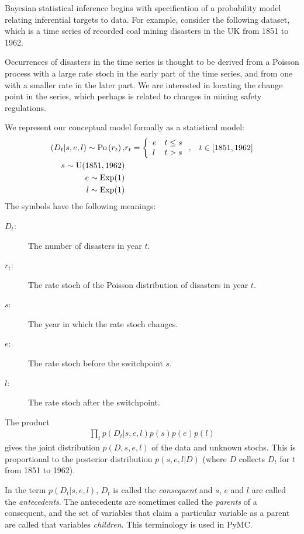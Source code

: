 \documentclass[]{book}
\begin{document}
Bayesian statistical inference begins with specification of a probability model relating inferential targets to data. For example, consider the following dataset, which is a time series of recorded coal mining disasters in the UK from 1851 to 1962.
\begin{center}
\end{center}
Occurrences of disasters in the time series is thought to be derived from a Poisson process with a large rate stoch in the early part of the time series, and from one with a smaller rate in the later part. We are interested in locating the change point in the series, which perhaps is related to changes in mining safety regulations.

We represent our conceptual model formally as a statistical model:
\begin{eqnarray*}
(D_t | s, e, l) \sim \textup{Po}\left(r_t\right), & r_t=\left\{\begin{array}{ll}
    e & t\le s\\ l & t>s
    \end{array}\right.,&t\in[1851,1962]\\
s\sim \textup{U}(1851, 1962)\\
e\sim \textup{Exp}(1)\\
l\sim \textup{Exp}(1)
\end{eqnarray*}
The symbols have the following meanings:
\begin{description}
    \item[$D_t$:] The number of disasters in year $t$.
    \item[$r_t$:] The rate stoch of the Poisson distribution of disasters in year $t$.
    \item[$s$:] The year in which the rate stoch changes.
    \item[$e$:] The rate stoch before the switchpoint $s$.
    \item[$l$:] The rate stoch after the switchpoint.
\end{description}

The product
\begin{eqnarray*}
\prod_t p(D_t|s,e,l) p(s)p(e)p(l)
\end{eqnarray*}
gives the joint distribution $p(D,s,e,l)$ of the data and unknown stochs. This is proportional to the posterior distribution $p(s,e,l|D)$ (where $D$ collects $D_t$ for $t$ from 1851 to 1962).

In the term $p(D_t|s,e,l)$, $D_t$ is called the \emph{consequent} and $s$, $e$ and $l$ are called the \emph{antecedents}. The antecedents are sometimes called the \emph{parents} of a consequent, and the set of variables that claim a particular variable as a parent are called that variables \emph{children}. This terminology is used in PyMC.
\end{document}
